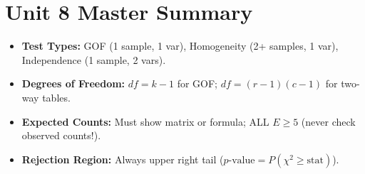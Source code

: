 \section{Unit 8 Master Summary}
\begin{lessonbox}
\begin{itemize}[leftmargin=1.2em]
  \item \textbf{Test Types:} GOF (1 sample, 1 var), Homogeneity (2+ samples, 1 var), Independence (1 sample, 2 vars).
  \item \textbf{Degrees of Freedom:} $df = k - 1$ for GOF; $df = (r - 1)(c - 1)$ for two-way tables.
  \item \textbf{Expected Counts:} Must show matrix or formula; ALL $E \ge 5$ (never check observed counts!).
  \item \textbf{Rejection Region:} Always upper right tail ($p\text{-value} = P(\chi^2 \ge \text{stat})$).
\end{itemize}
\end{lessonbox}
\clearpage
